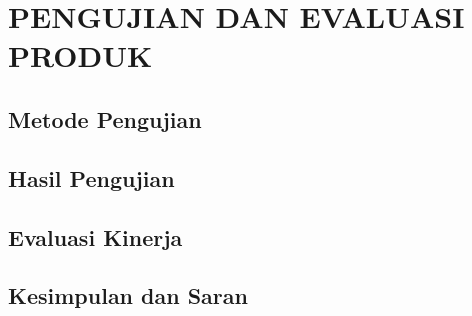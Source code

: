 \chapter{PENGUJIAN DAN EVALUASI PRODUK}

\section{Metode Pengujian}

\section{Hasil Pengujian}

\section{Evaluasi Kinerja}

\section{Kesimpulan dan Saran}